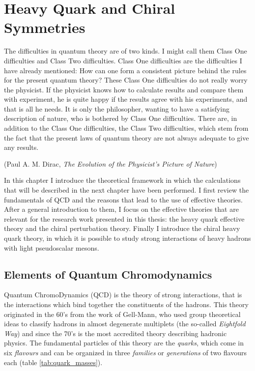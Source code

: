 \chapter{Heavy Quark and Chiral Symmetries}

\epigraph{The difficulties in quantum theory are of two kinds. I might call them Class One difficulties and Class Two difficulties. Class One difficulties are the difficulties I have already mentioned: How can one form a consistent picture behind the rules for the present quantum theory? These Class One difficulties do not really worry the physicist. If the physicist knows how to calculate results and compare them with experiment, he is quite happy if the results agree with his experiments, and that is all he needs. It is only the philosopher, wanting to have a satisfying description of nature, who is bothered by Class One difficulties. There are, in addition to the Class One difficulties, the Class Two difficulties, which stem from the fact that the present laws of quantum theory are not always adequate to give any results.}{(Paul A. M. Dirac, \emph{The Evolution of the Physicist's Picture of Nature})}


In this chapter I introduce the theoretical framework in which the calculations that will be described in the next chapter have been performed. I first review the fundamentals of QCD and the reasons that lead to the use of effective theories. After a general introduction to them, I focus on the effective theories that are relevant for the research work presented in this thesis: the heavy quark effective theory and the chiral perturbation theory. Finally I introduce the chiral heavy quark theory, in which it is possible to study strong interactions of heavy hadrons with light pseudoscalar mesons.

\section{Elements of Quantum Chromodynamics}
\label{sec:chromodynamics_elements}

Quantum ChromoDynamics (QCD) is the theory of strong interactions, that is the interactions which bind together the constituents of the hadrons. This theory originated in the 60's from the work of Gell-Mann, who used group theoretical ideas to classify hadrons in almost degenerate multiplets (the so-called \emph{Eightfold Way}) and since the 70's is the most accredited theory describing hadronic physics. The fundamental particles of this theory are the \emph{quarks}, which come in six \emph{flavours} and can be organized in three \emph{families} or \emph{generations} of two flavours each (table \ref{tab:quark_masses}).

